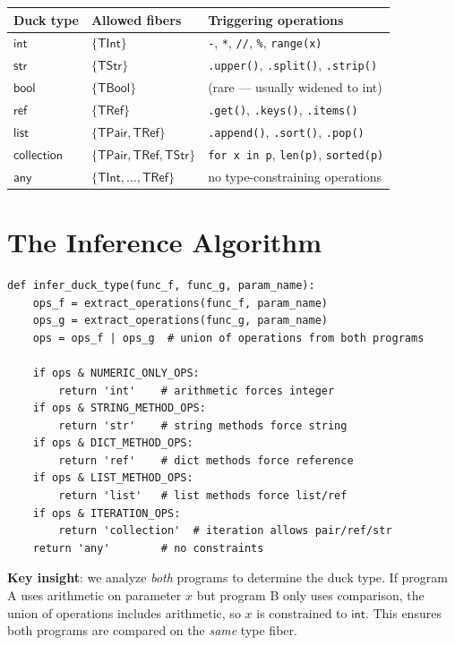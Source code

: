 \begin{center}
\begin{tabular}{l l l}
  \textbf{Duck type} & \textbf{Allowed fibers} & \textbf{Triggering operations} \\
  \hline
  $\mathsf{int}$ & $\{\mathsf{TInt}\}$ &
    \texttt{-}, \texttt{*}, \texttt{//}, \texttt{\%}, \texttt{range(x)} \\
  $\mathsf{str}$ & $\{\mathsf{TStr}\}$ &
    \texttt{.upper()}, \texttt{.split()}, \texttt{.strip()} \\
  $\mathsf{bool}$ & $\{\mathsf{TBool}\}$ &
    (rare --- usually widened to int) \\
  $\mathsf{ref}$ & $\{\mathsf{TRef}\}$ &
    \texttt{.get()}, \texttt{.keys()}, \texttt{.items()} \\
  $\mathsf{list}$ & $\{\mathsf{TPair}, \mathsf{TRef}\}$ &
    \texttt{.append()}, \texttt{.sort()}, \texttt{.pop()} \\
  $\mathsf{collection}$ & $\{\mathsf{TPair}, \mathsf{TRef}, \mathsf{TStr}\}$ &
    \texttt{for x in p}, \texttt{len(p)}, \texttt{sorted(p)} \\
  $\mathsf{any}$ & $\{\mathsf{TInt}, \ldots, \mathsf{TRef}\}$ &
    no type-constraining operations \\
\end{tabular}
\end{center}

\section{The Inference Algorithm}

\begin{lstlisting}[caption={Duck type inference}]
def infer_duck_type(func_f, func_g, param_name):
    ops_f = extract_operations(func_f, param_name)
    ops_g = extract_operations(func_g, param_name)
    ops = ops_f | ops_g  # union of operations from both programs

    if ops & NUMERIC_ONLY_OPS:
        return 'int'    # arithmetic forces integer
    if ops & STRING_METHOD_OPS:
        return 'str'    # string methods force string
    if ops & DICT_METHOD_OPS:
        return 'ref'    # dict methods force reference
    if ops & LIST_METHOD_OPS:
        return 'list'   # list methods force list/ref
    if ops & ITERATION_OPS:
        return 'collection'  # iteration allows pair/ref/str
    return 'any'        # no constraints
\end{lstlisting}

\textbf{Key insight}: we analyze \emph{both} programs to determine
the duck type.  If program A uses arithmetic on parameter $x$ but
program B only uses comparison, the union of operations includes
arithmetic, so $x$ is constrained to $\mathsf{int}$.  This ensures
both programs are compared on the \emph{same} type fiber.

